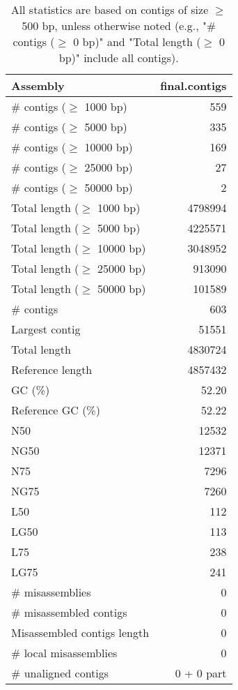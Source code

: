 \documentclass[12pt,a4paper]{article}
\begin{document}
\begin{table}[ht]
\begin{center}
\caption{All statistics are based on contigs of size $\geq$ 500 bp, unless otherwise noted (e.g., "\# contigs ($\geq$ 0 bp)" and "Total length ($\geq$ 0 bp)" include all contigs).}
\begin{tabular}{|l*{1}{|r}|}
\hline
Assembly & final.contigs \\ \hline
\# contigs ($\geq$ 1000 bp) & 559 \\ \hline
\# contigs ($\geq$ 5000 bp) & 335 \\ \hline
\# contigs ($\geq$ 10000 bp) & 169 \\ \hline
\# contigs ($\geq$ 25000 bp) & 27 \\ \hline
\# contigs ($\geq$ 50000 bp) & 2 \\ \hline
Total length ($\geq$ 1000 bp) & 4798994 \\ \hline
Total length ($\geq$ 5000 bp) & 4225571 \\ \hline
Total length ($\geq$ 10000 bp) & 3048952 \\ \hline
Total length ($\geq$ 25000 bp) & 913090 \\ \hline
Total length ($\geq$ 50000 bp) & 101589 \\ \hline
\# contigs & 603 \\ \hline
Largest contig & 51551 \\ \hline
Total length & 4830724 \\ \hline
Reference length & 4857432 \\ \hline
GC (\%) & 52.20 \\ \hline
Reference GC (\%) & 52.22 \\ \hline
N50 & 12532 \\ \hline
NG50 & 12371 \\ \hline
N75 & 7296 \\ \hline
NG75 & 7260 \\ \hline
L50 & 112 \\ \hline
LG50 & 113 \\ \hline
L75 & 238 \\ \hline
LG75 & 241 \\ \hline
\# misassemblies & 0 \\ \hline
\# misassembled contigs & 0 \\ \hline
Misassembled contigs length & 0 \\ \hline
\# local misassemblies & 0 \\ \hline
\# unaligned contigs & 0 + 0 part \\ \hline

\end{tabular}
\end{center}
\end{table}
\end{document}
